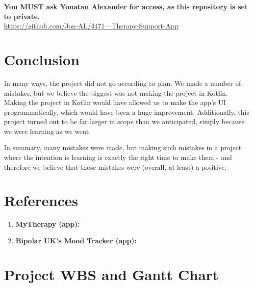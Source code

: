 \documentclass[11pt]{article}
\begin{document}
    \textbf{You MUST ask Yonatan Alexander for access, as this repository is set to private.}\\

    \href{Group Therapy-Support-App}{https://github.com/Jon-AL/4471---Therapy-Support-App}

    \pagebreak


    \section{Conclusion}\label{sec:conclusion}

    In many ways, the project did not go according to plan.
    We made a number of mistakes, but we believe the biggest was not making the project in Kotlin.
    Making the project in Kotlin would have allowed us to make the app's UI programmatically, which would have been a huge improvement.
    Additionally, this project turned out to be far larger in scope than we anticipated, simply because we were learning as we went.

    In summary, many mistakes were made, but making such mistakes in a project where the intention is learning is exactly the right time to make them - and therefore we believe that those mistakes were (overall, at least) a positive.

    \pagebreak


    \section{References}\label{sec:reference}

    \begin{enumerate}
        \item \textbf{MyTherapy (app):} \cite{MyTherapy}
        \item \textbf{Bipolar UK’s Mood Tracker (app):} \cite{BiPolUK}
    \end{enumerate}

    

    \printbibliography[heading=subbibintoc]
    \pagebreak

    \appendix
    \appendixpage


    \section{Project WBS and Gantt Chart}\label{sec:project-wbs}
\end{document}
